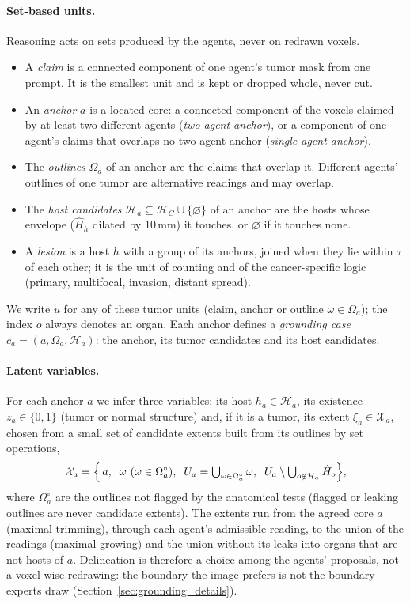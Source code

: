 \documentclass[fleqn,10pt]{olplainarticle}
\begin{document}
\paragraph{Set-based units.}
Reasoning acts on sets produced by the agents, never on redrawn voxels.
\begin{itemize}
\item A \emph{claim} is a connected component of one agent's tumor mask from one prompt. It is the smallest unit and is
kept or dropped whole, never cut.
\item An \emph{anchor} $a$ is a located core: a connected component of the voxels claimed by at least two different
agents (\emph{two-agent anchor}), or a component of one agent's claims that overlaps no two-agent anchor
(\emph{single-agent anchor}).
\item The \emph{outlines} $\Omega_a$ of an anchor are the claims that overlap it. Different agents' outlines of one
tumor are alternative readings and may overlap.
\item The \emph{host candidates} $\mathcal{H}_a\subseteq\mathcal{H}_C\cup\{\varnothing\}$ of an anchor are the hosts whose
envelope ($\hat H_h$ dilated by $10$\,mm) it touches, or $\varnothing$ if it touches none.
\item A \emph{lesion} is a host $h$ with a group of its anchors, joined when they lie within $\tau$ of each other; it is the
unit of counting and of the cancer-specific logic (primary, multifocal, invasion, distant spread).
\end{itemize}
We write $u$ for any of these tumor units (claim, anchor or outline $\omega\in\Omega_a$); the index $o$ always denotes an
organ. Each anchor defines a \emph{grounding case} $c_a=(a,\Omega_a,\mathcal{H}_a)$: the anchor, its tumor candidates and
its host candidates.

\paragraph{Latent variables.}
For each anchor $a$ we infer three variables: its host $h_a\in\mathcal{H}_a$, its existence $z_a\in\{0,1\}$ (tumor or
normal structure) and, if it is a tumor, its extent $\xi_a\in\mathcal{X}_a$, chosen from a small set of candidate extents
built from its outlines by set operations,
\begin{equation}
\label{eq:extents}
\mathcal{X}_a=\Bigl\{\,a,\;\;\omega\ (\omega\in\Omega^{\circ}_a),\;\;U_a=\textstyle\bigcup_{\omega\in\Omega^{\circ}_a}\omega,\;\;
U_a\setminus\bigcup_{o\notin\mathcal{H}_a}\hat H_{o}\Bigr\},
\end{equation}
where $\Omega^{\circ}_a$ are the outlines not flagged by the anatomical tests (flagged or leaking outlines are never candidate
extents). The extents run from the agreed core
$a$ (maximal trimming), through each agent's admissible reading, to the union of the readings (maximal growing) and the union
without its leaks into organs that are not hosts of $a$. Delineation is therefore a choice among the agents' proposals,
not a voxel-wise redrawing: the boundary the image prefers is not the boundary experts draw
(Section~\ref{sec:grounding_details}).
\end{document}
